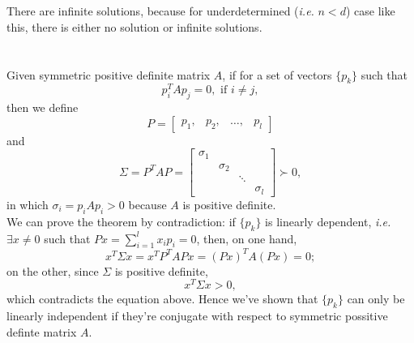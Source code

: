 \documentclass[11pt]{article}
\begin{document}
\subsection{}

\section{}
\subsection{}
There are infinite solutions, because for underdetermined (\textit{i.e.} $n<d$) case like this, there is either no solution or infinite solutions.

\section{}
Given symmetric positive definite matrix $A$, if for a set of vectors $\{p_k\}$ such that
$$p_i^TAp_j=0,\,\,\text{if}\,\,i\neq j,$$
then we define
$$P = \begin{bmatrix} p_1, & p_2, & \dots ,& p_l\end{bmatrix} $$
and
$$\Sigma = P^TAP = \begin{bmatrix} \sigma_1 \\ & \sigma_2 \\ & & \ddots \\ & & & \sigma_l \end{bmatrix}\succ0, $$
in which $\sigma_i = p_iAp_i > 0$ because $A$ is positive definite.\\[0.4cm]
We can prove the theorem by contradiction: if $\{p_k\}$ is linearly dependent, \textit{i.e.} $\exists x \neq 0$ such that $Px = \sum_{i=1}^lx_ip_i=0$, then, on one hand, 
\begin{equation} 
x^T\Sigma x = x^TP^TAPx = (Px)^TA(Px) = 0;
\nonumber\end{equation} 
on the other, since $\Sigma$ is positive definite, 
$$x^T\Sigma x > 0,$$
which contradicts the equation above. Hence we've shown that $\{p_k\}$ can only be linearly independent if they're conjugate with respect to symmetric possitive definte matrix $A$.
\end{document}
